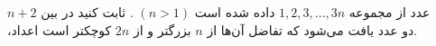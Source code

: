 \EXERCISE
$n + 2$
عدد از مجموعه
${1, 2, 3, ..., 3n}$
داده شده است
$(n > 1)$
. ثابت کنید در بین اعداد‫‪،‬‬ دو عدد یافت می‌شود که تفاضل آن‌ها از
$n$
بزرگتر و از
$2n$
کوچکتر است.